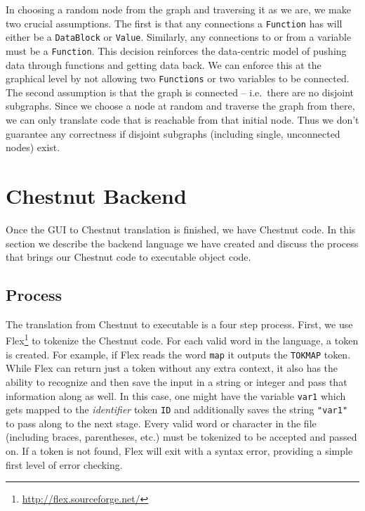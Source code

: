 \documentclass[twocolumn]{article}
\renewcommand{\|}{\origbar} %
\newcommand{\code}[1]{\texttt{#1}}
\begin{document}
In choosing a random node from the graph and traversing it as we are, we make two crucial assumptions. The first is that any connections a \code{Function} has will either be a \code{DataBlock} or \code{Value}. Similarly, any connections to or from a variable must be a \code{Function}. This decision reinforces the data-centric model of pushing data through functions and getting data back. We can enforce this at the graphical level by not allowing two \code{Functions} or two variables to be connected. The second assumption is that the graph is connected -- i.e.\ there are no disjoint subgraphs. Since we choose a node at random and traverse the graph from there, we can only translate code that is reachable from that initial node. Thus we don't guarantee any correctness if disjoint subgraphs (including single, unconnected nodes) exist.

\section{Chestnut Backend}
\label{sec:chestnutBackend}

Once the GUI to Chestnut translation is finished, we have Chestnut code. In this section we describe the backend language we have created and discuss the process that brings our Chestnut code to executable object code.

\subsection{Process}

The translation from Chestnut to executable is a four step process. First, we use Flex\footnote{\url{http://flex.sourceforge.net/}} to tokenize the Chestnut code. For each valid word in the language, a token is created. For example, if Flex reads the word \code{map} it outputs the \code{TOKMAP} token. While Flex can return just a token without any extra context, it also has the ability to recognize and then save the input in a string or integer and pass that information along as well. In this case, one might have the variable \code{var1} which gets mapped to the {\em identifier} token \code{ID} and additionally saves the string \code{"var1"} to pass along to the next stage. Every valid word or character in the file (including braces, parentheses, etc.) must be tokenized to be accepted and passed on. If a token is not found, Flex will exit with a syntax error, providing a simple first level of error checking. 
\end{document}
